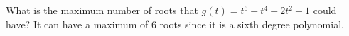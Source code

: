 {What is the maximum number of roots that $g(t) = t^6+t^4-2t^2 +1$ could have?}
{It can have a maximum of 6 roots since it is a sixth degree polynomial.}
